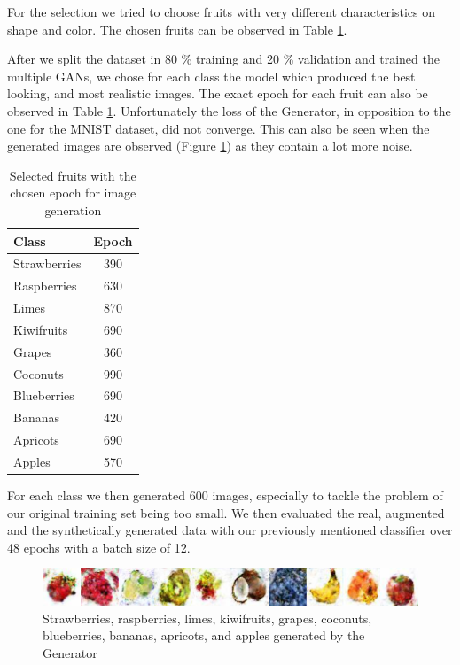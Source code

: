 \documentclass[13pt]{article}
\begin{document}
For the selection we tried to choose fruits with very different characteristics on shape and color. The chosen fruits can be observed in Table \ref{tab:fruits}.

After we split the dataset in 80 \% training and 20 \% validation and trained the multiple GANs, we chose for each class the model which produced the best looking, and most realistic images. The exact epoch for each fruit can also be observed in Table \ref{tab:fruits}. Unfortunately the loss of the Generator, in opposition to the one for the MNIST dataset, did not converge. This can also be seen when the generated images are observed (Figure \ref{fig:genfruits}) as they contain a lot more noise. 

\begin{table}[h]
    \centering
    \begin{tabular}{|l|c|}
    \hline
        Class & Epoch \\ \hline
        Strawberries & 390 \\ \hline
Raspberries & 630 \\ \hline
Limes & 870 \\ \hline
Kiwifruits & 690 \\ \hline
Grapes & 360 \\ \hline
Coconuts & 990 \\ \hline
Blueberries & 690 \\ \hline
Bananas & 420 \\ \hline
Apricots & 690 \\ \hline
Apples & 570 \\ \hline
    \end{tabular}
    \caption{Selected fruits with the chosen epoch for image generation}
    \label{tab:fruits}
\end{table}

For each class we then generated 600 images, especially to tackle the problem of our original training set being too small. We then evaluated the real, augmented and the synthetically generated data with our previously mentioned classifier over 48 epochs with a batch size of 12.

\begin{figure}[h!]
\centering
\centerline{\includegraphics[width=\textwidth]{plots/fruits.png}}
\caption{Strawberries, raspberries, limes, kiwifruits, grapes, coconuts, blueberries, bananas, apricots, and apples generated by the Generator}
\label{fig:genfruits}
\end{figure}
\end{document}
